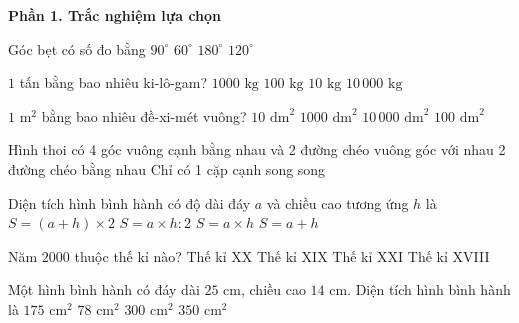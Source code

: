 \textbf{Phần 1. Trắc nghiệm lựa chọn}

\begin{ex} %
Góc bẹt có số đo bằng
\choice
{$90^\circ$}
{$60^\circ$}
{\True $180^\circ$}
{$120^\circ$}
\end{ex}

\begin{ex} %
$1$ tấn bằng bao nhiêu ki-lô-gam?
\choice
{\True $1000\text{ kg}$}
{$100\text{ kg}$}
{$10\text{ kg}$}
{$10\,000\text{ kg}$}
\end{ex}

\begin{ex} %
$1\text{ m}^2$ bằng bao nhiêu đề-xi-mét vuông?
\choice
{$10\text{ dm}^2$}
{$1000\text{ dm}^2$}
{$10\,000\text{ dm}^2$}
{\True $100\text{ dm}^2$}
\end{ex}

\begin{ex} %
Hình thoi có
\choice
{4 góc vuông}
{ cạnh bằng nhau và 2 đường chéo vuông góc với nhau}
{2 đường chéo bằng nhau}
{Chỉ có 1 cặp cạnh song song}
\end{ex}

\begin{ex} %
Diện tích hình bình hành có độ dài đáy $a$ và chiều cao tương ứng $h$ là
\choice
{$S = (a + h) \times 2$}
{$S = a \times h : 2$}
{\True $S = a \times h$}
{$S = a + h$}
\end{ex}

\begin{ex} %
Năm $2000$ thuộc thế kỉ nào?
\choice
{\True Thế kỉ XX}
{Thế kỉ XIX}
{Thế kỉ XXI}
{Thế kỉ XVIII}
\end{ex}

\begin{ex} %
Một hình bình hành có đáy dài $25\text{ cm}$, chiều cao $14\text{ cm}$. Diện tích hình bình hành là
\choice
{$175\text{ cm}^2$}
{$78\text{ cm}^2$}
{$300\text{ cm}^2$}
{\True $350\text{ cm}^2$}
\end{ex}

